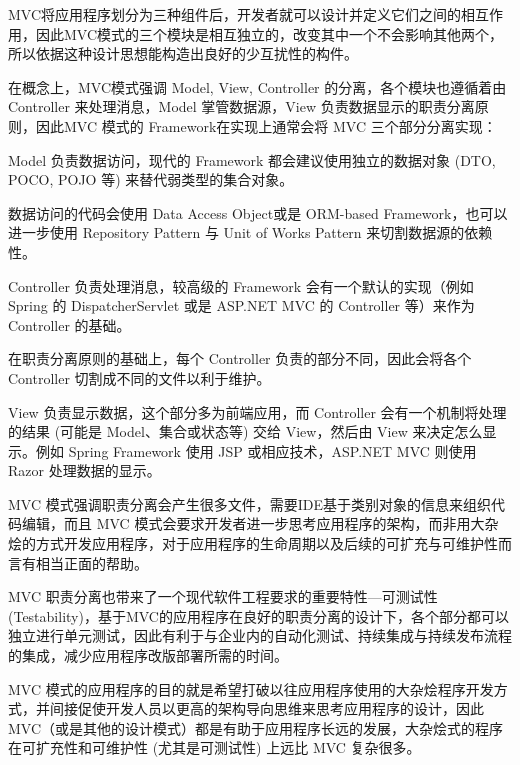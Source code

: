 MVC将应用程序划分为三种组件后，开发者就可以设计并定义它们之间的相互作用，因此MVC模式的三个模块是相互独立的，改变其中一个不会影响其他两个，所以依据这种设计思想能构造出良好的少互扰性的构件。

在概念上，MVC模式强调 Model, View, Controller 的分离，各个模块也遵循着由 Controller 来处理消息，Model 掌管数据源，View 负责数据显示的职责分离原则，因此MVC 模式的 Framework在实现上通常会将 MVC 三个部分分离实现：

\begin{compactitem}
\item Model 负责数据访问，现代的 Framework 都会建议使用独立的数据对象 (DTO, POCO, POJO 等) 来替代弱类型的集合对象。

数据访问的代码会使用 Data Access Object或是 ORM-based Framework，也可以进一步使用 Repository Pattern 与 Unit of Works Pattern 来切割数据源的依赖性。

\item Controller 负责处理消息，较高级的 Framework 会有一个默认的实现（例如Spring 的 DispatcherServlet 或是 ASP.NET MVC 的 Controller 等）来作为 Controller 的基础。

在职责分离原则的基础上，每个 Controller 负责的部分不同，因此会将各个 Controller 切割成不同的文件以利于维护。

\item View 负责显示数据，这个部分多为前端应用，而 Controller 会有一个机制将处理的结果 (可能是 Model、集合或状态等) 交给 View，然后由 View 来决定怎么显示。例如 Spring Framework 使用 JSP 或相应技术，ASP.NET MVC 则使用 Razor 处理数据的显示。


\end{compactitem}


MVC 模式强调职责分离会产生很多文件，需要IDE基于类别对象的信息来组织代码编辑，而且 MVC 模式会要求开发者进一步思考应用程序的架构，而非用大杂烩的方式开发应用程序，对于应用程序的生命周期以及后续的可扩充与可维护性而言有相当正面的帮助。

MVC 职责分离也带来了一个现代软件工程要求的重要特性—可测试性 (Testability)，基于MVC的应用程序在良好的职责分离的设计下，各个部分都可以独立进行单元测试，因此有利于与企业内的自动化测试、持续集成与持续发布流程的集成，减少应用程序改版部署所需的时间。

MVC 模式的应用程序的目的就是希望打破以往应用程序使用的大杂烩程序开发方式，并间接促使开发人员以更高的架构导向思维来思考应用程序的设计，因此MVC（或是其他的设计模式）都是有助于应用程序长远的发展，大杂烩式的程序在可扩充性和可维护性 (尤其是可测试性) 上远比 MVC 复杂很多。

